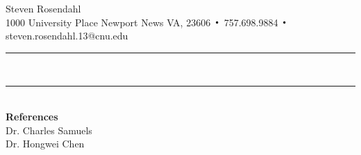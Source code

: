 \documentclass{hw}
\DeclareMathOperator*{\Bigcdot}{\scalerel*{\cdot}{\bigodot}}
\begin{document}
\noindent
\begin{center}
{\huge Steven Rosendahl}\\
{\small 1000 University Place Newport News VA, 23606 $\Bigcdot$ 757.698.9884 $\Bigcdot$
steven.rosendahl.13@cnu.edu}\\
\end{center}
\hrule
\noindent \\

\hrule
\noindent \\


\newpage
\noindent\textbf{\large References}
\noindent \\

\noindent Dr. Charles Samuels\\
\noindent Dr. Hongwei Chen
\end{document}
